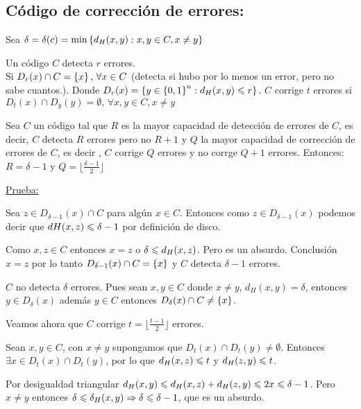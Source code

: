 \documentclass[12pt,a4paper]{article}
\begin{document}
\subsection{Código de corrección de errores:}

\begin{definition} Sea $\delta = \delta(c) = \min \left\lbrace d_{H}(x,y): x,y\in C, x\neq y \right\rbrace$
\end{definition}

\begin{definition} Un código $C$ detecta $r$ errores.\\
    Si $D_{r}(x) \cap C = \left\lbrace x \right\rbrace,\, \forall x\in C$ (detecta si hubo por lo menos 
    un error, pero no sabe cuantos.). Donde $D_{r}(x) = \left\lbrace y\in \left\lbrace 0,1 \right\rbrace^{n}: d_{H}(x,y) \leqslant r \right\rbrace$.
    $C$ corrige $t$ errores si $D_{t}(x) \cap D_{y}(y) = \emptyset,\, \forall x,y \in C, x\neq y$
\end{definition}

\begin{teorema} Sea $C$ un código tal que $R$ es la mayor capacidad de detección 
    de errores de $C$, es decir, $C$ detecta $R$ errores pero no $R+1$ y $Q$ la 
    mayor capacidad de corrección de errores de $C$, es decir , $C$ corrige $Q$
    errores y no corrge $Q+1$ errores. Entonces:
    $R = \delta-1$ y $Q = \lfloor \frac{\delta-1}{2} \rfloor $
\end{teorema}
\underline{Prueba:}
\medskip

Sea $z\in D_{\delta -1}(x) \cap C$ para algún $x\in C$. Entonces como $z\in D_{\delta -1}(x)$
podemos decir que $d{H}(x,z) \leqslant \delta -1$ por definición de disco.
\medskip

Como $x,z \in C$ entonces $x=z$ o $\delta \leqslant d_{H}(x,z)$. Pero es un absurdo. Conclusión 
$x=z$ por lo tanto $D_{\delta -1}(x) \cap C = \left\lbrace x \right\rbrace$ y $C$ detecta $\delta -1$ errores.
\medskip

$C$ no detecta $\delta$ errores. Pues sean $x,y\in C$ donde $x\neq y$, $d_{H}(x,y) = \delta$, entonces 
$y\in D_{\delta}(x)$ además $y\in C$ entonces $D_{\delta}(x) \cap C \neq \left\lbrace x \right\rbrace$.
\medskip

Veamos ahora que $C$ corrige $t = \lfloor \frac{t-1}{2} \rfloor$ errores.
\medskip

Sean $x,y\in C$, con $x\neq y$ supongamos que $D_{t}(x) \cap D_{t}(y) \neq \emptyset$. 
Entonces $\exists x\in D_{t}(x) \cap D_{t}(y)$, por lo que $d_{H}(x,z) \leqslant t$ y 
$d_{H}(z,y) \leqslant t$.
\medskip

Por desigualdad triangular $d_{H}(x,y) \leqslant d_{H}(x,z) + d_{H}(z,y) \leqslant 2x \leqslant \delta -1$. 
Pero $x\neq y$ entonces $\delta \leqslant \delta_{H}(x,y) \Rightarrow \delta \leqslant \delta -1$, 
que es un absurdo.
\medskip
\end{document}
